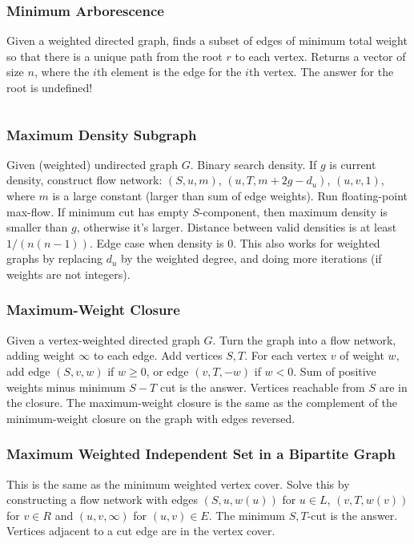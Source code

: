 \documentclass[8pt,a4paper,landscape,oneside]{amsart}
\newcommand{\mintedstyle}[2]{\inputminted[fontsize=\normalsize,baselinestretch=.9,breaklines,breakautoindent,tabsize=2]{#1}{code/#2}}
\newcommand{\code}[1]{\mintedstyle{cpp}{#1}}
\begin{document}
\begin{multicols*}{3}
\subsubsection{Minimum Arborescence}
Given a weighted directed graph, finds a subset of edges of minimum
total weight so that there is a unique path from the root $r$ to each
vertex. Returns a vector of size $n$, where the $i$th element is the
edge for the $i$th vertex. The answer for the root is undefined!
\code{graphs/arborescence.cpp}


\subsubsection{Maximum Density Subgraph}
Given (weighted) undirected graph $G$. Binary search density. If $g$ is
current density, construct flow network: $(S, u, m)$, $(u, T,
m+2g-d_u)$, $(u,v,1)$, where $m$ is a large constant (larger than sum
of edge weights). Run floating-point max-flow. If minimum cut has empty
$S$-component, then maximum density is smaller than $g$, otherwise it's
larger. Distance between valid densities is at least $1/(n(n-1))$. Edge
case when density is $0$. This also works for weighted graphs by
replacing $d_u$ by the weighted degree, and doing more iterations (if
weights are not integers).

\subsubsection{Maximum-Weight Closure}
Given a vertex-weighted directed graph $G$. Turn the graph into a flow
network, adding weight $\infty$ to each edge. Add vertices $S,T$. For
each vertex $v$ of weight $w$, add edge $(S,v,w)$ if $w\geq 0$, or edge
$(v,T,-w)$ if $w<0$. Sum of positive weights minus minimum $S-T$ cut is
the answer. Vertices reachable from $S$ are in the closure. The
maximum-weight closure is the same as the complement of the
minimum-weight closure on the graph with edges reversed.

\subsubsection{Maximum Weighted Independent Set in a Bipartite Graph}
This is the same as the minimum weighted vertex cover. Solve this by
constructing a flow network with edges $(S,u,w(u))$ for $u\in L$,
$(v,T,w(v))$ for $v\in R$ and $(u,v,\infty)$ for $(u,v)\in E$. The
minimum $S,T$-cut is the answer. Vertices adjacent to a cut edge are
in the vertex cover.


\end{multicols*}
\end{document}
